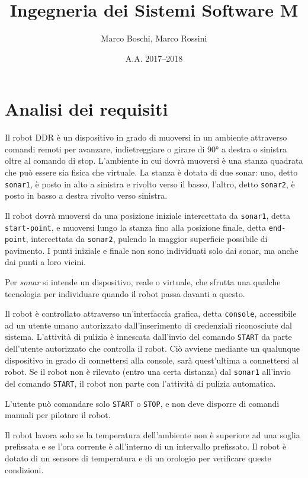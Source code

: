 

\title{Ingegneria dei Sistemi Software M}
\date{A.A. 2017--2018}
\author{Marco Boschi, Marco Rossini}



\maketitletoc

\section{Analisi dei requisiti}
Il robot DDR è un dispositivo in grado di muoversi in un ambiente attraverso comandi remoti per avanzare, indietreggiare o girare di \ang{90} a destra o sinistra oltre al comando di stop. L'ambiente in cui dovrà muoversi è una stanza quadrata che può essere sia fisica che virtuale. La stanza è dotata di due sonar: uno, detto \texttt{sonar1}, è posto in alto a sinistra e rivolto verso il basso, l'altro, detto \texttt{sonar2}, è posto in basso a destra rivolto verso sinistra.

Il robot dovrà muoversi da una posizione iniziale intercettata da \texttt{sonar1}, detta \texttt{start-point}, e muoversi lungo la stanza fino alla posizione finale, detta \texttt{end-point}, intercettata da \texttt{sonar2}, pulendo la maggior superficie possibile di pavimento. I punti iniziale e finale non sono individuati solo dai sonar, ma anche dai punti a loro vicini.

Per \textit{sonar} si intende un dispositivo, reale o virtuale, che sfrutta una qualche tecnologia per individuare quando il robot passa davanti a questo.

Il robot è controllato attraverso un'interfaccia grafica, detta \texttt{console}, accessibile ad un utente umano autorizzato dall'inserimento di credenziali riconosciute dal sistema. L'attività di pulizia è innescata dall'invio del comando \texttt{START} da parte dell'utente autorizzato che controlla il robot. Ciò avviene mediante un qualunque dispositivo in grado di connettersi alla console, sarà quest'ultima a connettersi al robot. Se il robot non è rilevato (entro una certa distanza) dal \texttt{sonar1} all'invio del comando \texttt{START}, il robot non parte con l'attività di pulizia automatica. 

L'utente può comandare solo \texttt{START} o \texttt{STOP}, e non deve disporre di comandi manuali per pilotare il robot.

Il robot lavora solo se la temperatura dell'ambiente non è superiore ad una soglia prefissata e se l'ora corrente è all'interno di un intervallo prefissato. Il robot è dotato di un sensore di temperatura e di un orologio per verificare queste condizioni.

